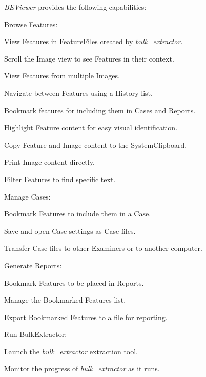 \documentclass[10pt,twoside]{article}
\newcommand{\bulk}{\emph{bulk\_extractor}\xspace}
\newcommand{\bev}{\emph{BEViewer}\xspace}
\begin{document}
\bev provides the following capabilities:
\begin{compactitem}
\item Browse \glspl{Feature}:
\begin{compactitem}
\item View Features in \glspl{FeatureFile} created by \bulk.
\item Scroll the \gls{Image} view to see Features in their context.
\item View Features from multiple Images.
\item \gls{Navigate} between Features using a History list.
\item \gls{Bookmark} features for including them in Cases and Reports.
\item \gls{Highlight} Feature content for easy visual identification.
\item Copy Feature and Image content to the \gls{SystemClipboard}.
\item Print Image content directly.
\item Filter Features to find specific text.
\end{compactitem}
\item Manage \glspl{Case}:
\begin{compactitem}
\item Bookmark Features to include them in a Case.
\item Save and open Case settings as Case files.
\item Transfer Case files to other Examiners or to another computer.
\end{compactitem}
\item Generate \glspl{Report}:
\begin{compactitem}
\item Bookmark Features to be placed in Reports.
\item Manage the Bookmarked Features list.
\item Export Bookmarked Features to a file for reporting.
\end{compactitem}
\item Run \gls{BulkExtractor}:
\begin{compactitem}
\item Launch the \bulk extraction tool.
\item Monitor the progress of \bulk as it runs.
\end{compactitem}
\end{compactitem}
\end{document}
